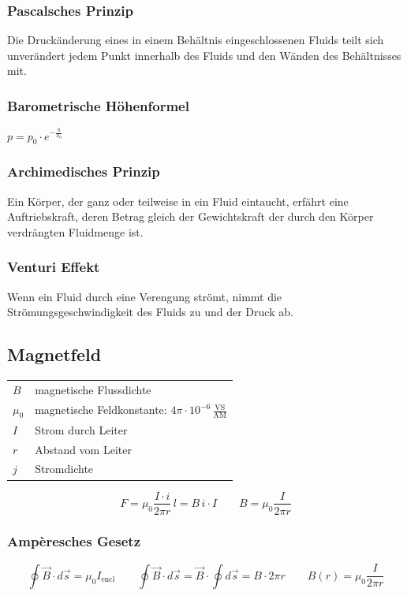 \documentclass[10pt,a4paper]{article}
\begin{document}
	\medskip
	\subsubsection{Pascalsches Prinzip}
	Die Druckänderung eines in einem Behältnis eingeschlossenen Fluids teilt sich unverändert
	jedem Punkt innerhalb des Fluids und den Wänden des Behältnisses mit.
	
	\medskip
	\subsubsection{Barometrische Höhenformel}
	$p=p_0\cdot e^{-\frac{h}{h_0}}$
	
	\medskip
	\subsubsection{Archimedisches Prinzip}
	Ein Körper, der ganz oder teilweise in ein Fluid eintaucht, erfährt eine Auftriebskraft,
	deren Betrag gleich der Gewichtskraft der durch den Körper verdrängten Fluidmenge ist.
	
	\subsubsection{Venturi Effekt}
	Wenn ein Fluid durch eine Verengung strömt, nimmt die
	Strömungsgeschwindigkeit des Fluids zu und der Druck
	ab.
	
	\subsection{Magnetfeld}
	
	\begin{tabular}{@{}ll@{}}
		$B$ & magnetische Flussdichte \\
		$\mu_0$ & magnetische Feldkonstante: $4\pi \cdot 10^{-6}\,\tfrac{\mathrm{VS}}{\mathrm{AM}}$ \\
		$I$ & Strom durch Leiter \\
		$r$ & Abstand vom Leiter \\
		$j$ & Stromdichte \\
	\end{tabular}
	
	\[
	F=\mu_0 \frac{I\cdot i}{2\pi r}\,l = B\,i \cdot I
	\qquad
	B = \mu_0 \frac{I}{2 \pi r}
	\]
	
	\subsubsection*{Ampèresches Gesetz}
	\[
	\oint \vec{B} \cdot d\vec{s} = \mu_0 I_{\text{encl}}
	\qquad
	\oint \vec{B} \cdot d\vec{s} = \vec{B} \cdot \oint d\vec{s} = B \cdot 2\pi r
	\qquad
	B(r) = \mu_0 \frac{I}{2\pi r}
	\]
	
\end{document}
